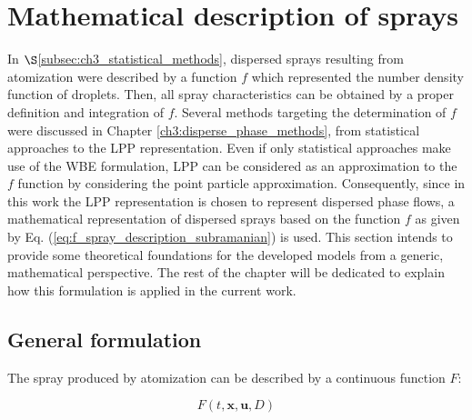 


\section{Mathematical description of sprays}
	\label{sec:ch4_spray_description}

In $\S$\ref{subsec:ch3_statistical_methods}, dispersed sprays resulting from atomization were described by a function $f$ which represented the number density function of droplets. Then, all spray characteristics can be obtained by a proper definition and integration of $f$. Several methods targeting the determination of $f$ were discussed in Chapter \ref{ch3:disperse_phase_methods}, from statistical approaches to the LPP representation. Even if only statistical approaches make use of the WBE formulation, LPP can be considered as an approximation to the $f$ function by considering the point particle approximation. Consequently, since in this work the LPP representation is chosen to represent dispersed phase flows, a mathematical representation of dispersed sprays based on the function $f$ as given by Eq. (\ref{eq:f_spray_description_subramanian}) is used. This section intends to provide some theoretical foundations for the developed models from a generic, mathematical perspective. The rest of the chapter will be dedicated to explain how this formulation is applied in the current work. \\

\clearpage

\subsection{General formulation}

The spray produced by atomization can be described by a continuous function $F$:

\begin{equation}
F \left( t, \textbf{x}, \textbf{u}, D \right) 
\end{equation}


